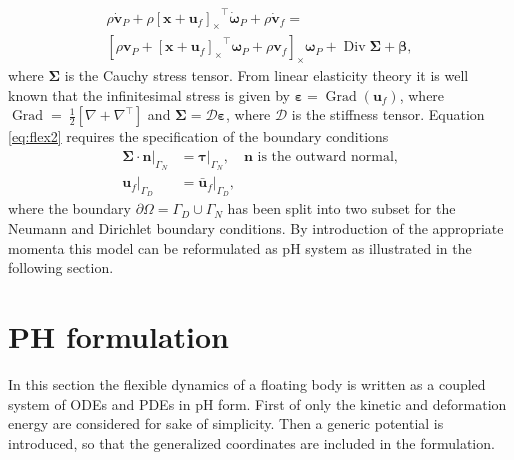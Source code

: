 \documentclass{svjour3}                     %
\DeclareMathOperator*{\Grad}{Grad}
\DeclareMathOperator*{\Div}{Div}
\newcommand{\crmat}[1]{\ensuremath{[#1]_{\times}}}
\begin{document}
\begin{equation}
\label{eq:flex2}
\begin{split}
\rho \dot{\bm{v}}_P + \rho \crmat{\bm{x}+\bm{u}_f}^\top \dot{\bm\omega}_P  + \rho \dot{\bm{v}}_f = \\
\left[\rho \bm{v}_P + \crmat{\bm{x}+\bm{u}_f}^\top \bm\omega_P + \rho \bm{v}_f \right]_\times \bm\omega_P + \Div{\bm\Sigma} + \bm\beta,
\end{split}
\end{equation}
where $\bm\Sigma$ is the Cauchy stress tensor. From linear elasticity theory it is well known that the infinitesimal stress is given by $\bm\varepsilon = \Grad(\bm{u}_f)$, where $\Grad=~\frac{1}{2} [\nabla + \nabla^\top]$ and $\bm\Sigma =  \bm{\mathcal{D}} \bm\varepsilon$, where $ \bm{\mathcal{D}}$ is the stiffness tensor. Equation \eqref{eq:flex2}  requires the specification of the boundary conditions
\begin{equation}
\begin{aligned}
\bm\Sigma \cdot \bm{n}|_{\Gamma_N} &= \bm\tau|_{\Gamma_N}, \quad \text{$\bm{n}$ is the outward normal,} \\
\bm{u}_f|_{\Gamma_D} &= \bm{\bar{u}}_f|_{\Gamma_D},
\end{aligned}
\end{equation}
where the boundary $\partial \Omega = \Gamma_D \cup \Gamma_N$ has been split into two subset for the Neumann and Dirichlet boundary conditions. By introduction of the appropriate momenta this model can be reformulated as pH system as illustrated in the following section.

\section{PH formulation}
\label{sec:pH_fd}
In this section the flexible dynamics of a floating body is written as a coupled system of ODEs and PDEs in pH form. First of only the kinetic and deformation energy are considered for sake of simplicity. Then a generic potential is introduced, so that the generalized coordinates are included in the formulation. 
\end{document}
